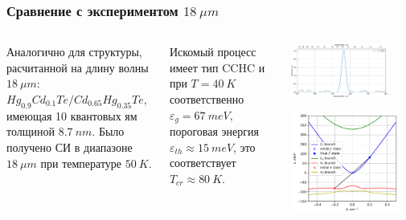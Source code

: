 \documentclass[9pt,pdf]{beamer}
\begin{document}
  \begin{frame}
    \frametitle{Сравнение с экспериментом $18~\mu m$}
    
    \begin{columns}
        Аналогично для структуры, расчитанной на длину волны $18~\mu m$:
        $Hg_{0.9} Cd_{0.1}Te/Cd_{0.65} Hg_{0.35} Te$, имеющая 10 квантовых ям
        толщиной $8.7~nm$. 
        Было получено СИ в диапазоне $18~\mu m$ при температуре $50~K$. 
 
        Искомый процесс имеет тип CCHC и при $T=40~K$ соответственно
        $\varepsilon_g = 67~meV$, пороговая энергия $\varepsilon_{th} \approx 15~meV$, это соответствует 
        $T_{cr} \approx 80~K$.
        \vspace{3.5cm}

        \begin{center}
          \includegraphics[width=0.8\textwidth]{./images/new_18um_spectre.pdf}
          
          \includegraphics[width=0.9\textwidth]{./images/18u_impure_40K.pdf}
        \end{center}
    \end{columns}
  \end{frame}
\end{document}
